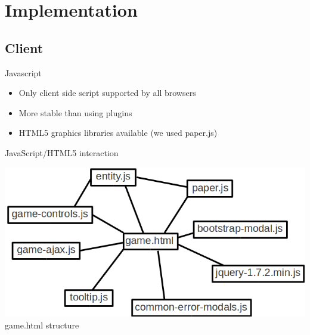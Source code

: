 \documentclass{beamer}
\begin{document}
\section{Implementation}
\subsection{Client}

\begin{frame}{Javascript}
  \begin{itemize}
    \item Only client side script supported by all browsers
    \vspace{\baselineskip}
    \item More stable than using plugins
    \vspace{\baselineskip}
    \item HTML5 graphics libraries available (we used paper.js)
  \end{itemize}
\end{frame}

\begin{frame}{JavaScript/HTML5 interaction}
  \begin{center}
    \includegraphics[scale=0.4]{game_html_structure.png} \\
    game.html structure
  \end{center}
\end{frame}
\end{document}
